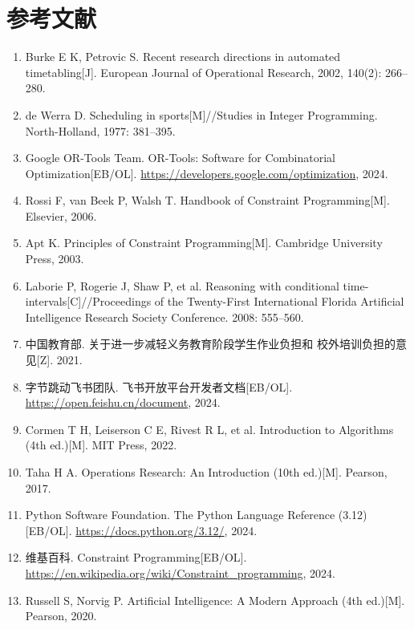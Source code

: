 ﻿%
\clearpage
\section*{参考文献}

\begin{enumerate}[leftmargin=2em,itemsep=0.3em]
  \item Burke E K, Petrovic S. Recent research directions in automated
    timetabling[J]. European Journal of Operational Research,
    2002, 140(2): 266--280.

  \item de Werra D. Scheduling in sports[M]//Studies in Integer
    Programming. North-Holland, 1977: 381--395.

  \item Google OR-Tools Team. OR-Tools: Software for Combinatorial
    Optimization[EB/OL]. \url{https://developers.google.com/optimization},
    2024.

  \item Rossi F, van Beek P, Walsh T. Handbook of Constraint
    Programming[M]. Elsevier, 2006.

  \item Apt K. Principles of Constraint Programming[M]. Cambridge
    University Press, 2003.

  \item Laborie P, Rogerie J, Shaw P, et al. Reasoning with
    conditional time-intervals[C]//Proceedings of the Twenty-First
    International Florida Artificial Intelligence Research Society
    Conference. 2008: 555--560.

  \item 中国教育部. 关于进一步减轻义务教育阶段学生作业负担和
    校外培训负担的意见[Z]. 2021.

  \item 字节跳动飞书团队. 飞书开放平台开发者文档[EB/OL].
    \url{https://open.feishu.cn/document}, 2024.

  \item Cormen T H, Leiserson C E, Rivest R L, et al. Introduction
    to Algorithms (4th ed.)[M]. MIT Press, 2022.

  \item Taha H A. Operations Research: An Introduction (10th ed.)[M].
    Pearson, 2017.

  \item Python Software Foundation. The Python Language Reference
    (3.12)[EB/OL]. \url{https://docs.python.org/3.12/}, 2024.

  \item 维基百科. Constraint Programming[EB/OL].
    \url{https://en.wikipedia.org/wiki/Constraint_programming},
    2024.

  \item Russell S, Norvig P. Artificial Intelligence: A Modern
    Approach (4th ed.)[M]. Pearson, 2020.
\end{enumerate}
